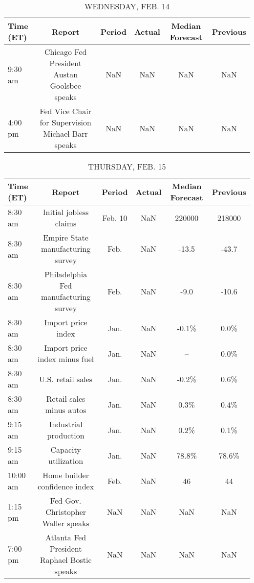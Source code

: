 \documentclass{article}%
\begin{document}
\begin{table}[htbp]%
\caption{WEDNESDAY, FEB. 14}%
\centering%
\begin{adjustbox}{width=1\textwidth}%
\begin{tabular}{lccccc}
\toprule
Time (ET) &                                             Report & Period & Actual & Median Forecast & Previous \\
\midrule
  9:30 am &       Chicago Fed President Austan Goolsbee speaks &    NaN &    NaN &             NaN &      NaN \\
  4:00 pm & Fed Vice Chair for Supervision Michael Barr speaks &    NaN &    NaN &             NaN &      NaN \\
\bottomrule
\end{tabular}
%
\end{adjustbox}%
\end{table}

%


\begin{table}[htbp]%
\caption{THURSDAY, FEB. 15}%
\centering%
\begin{adjustbox}{width=1\textwidth}%
\begin{tabular}{lccccc}
\toprule
Time (ET) &                                      Report &  Period & Actual & Median Forecast & Previous \\
\midrule
  8:30 am &                      Initial jobless claims & Feb. 10 &    NaN &          220000 &   218000 \\
  8:30 am &           Empire State manufacturing survey &    Feb. &    NaN &           -13.5 &    -43.7 \\
  8:30 am &       Philadelphia Fed manufacturing survey &    Feb. &    NaN &            -9.0 &    -10.6 \\
  8:30 am &                          Import price index &    Jan. &    NaN &           -0.1\% &     0.0\% \\
  8:30 am &               Import price index minus fuel &    Jan. &    NaN &              -- &     0.0\% \\
  8:30 am &                           U.S. retail sales &    Jan. &    NaN &           -0.2\% &     0.6\% \\
  8:30 am &                    Retail sales minus autos &    Jan. &    NaN &            0.3\% &     0.4\% \\
  9:15 am &                       Industrial production &    Jan. &    NaN &            0.2\% &     0.1\% \\
  9:15 am &                        Capacity utilization &    Jan. &    NaN &           78.8\% &    78.6\% \\
 10:00 am &               Home builder confidence index &    Feb. &    NaN &              46 &       44 \\
  1:15 pm &          Fed Gov. Christopher Waller speaks &     NaN &    NaN &             NaN &      NaN \\
  7:00 pm & Atlanta Fed President Raphael Bostic speaks &     NaN &    NaN &             NaN &      NaN \\
\bottomrule
\end{tabular}
%
\end{adjustbox}%
\end{table}
\end{document}
